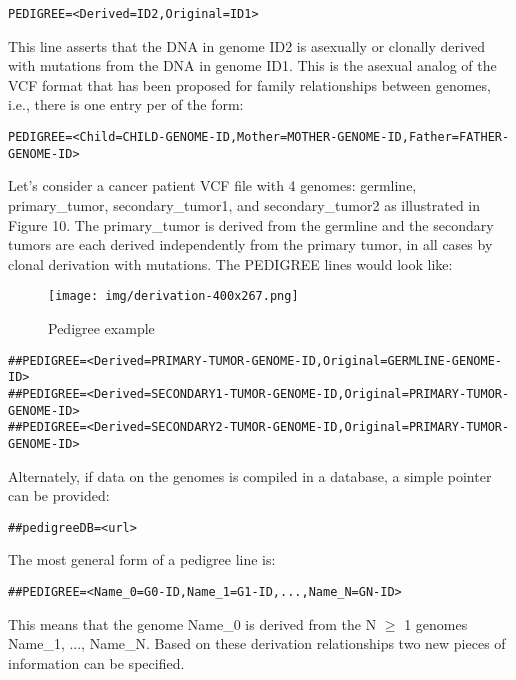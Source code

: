\documentclass[8pt]{article}
\begin{document}
\begin{verbatim}
PEDIGREE=<Derived=ID2,Original=ID1>
\end{verbatim}

This line asserts that the DNA in genome ID2 is asexually or clonally derived with mutations from the DNA in genome ID1. This is the asexual analog of the VCF format that has been proposed for family relationships between genomes, i.e., there is one entry per of the form:

\begin{verbatim}
PEDIGREE=<Child=CHILD-GENOME-ID,Mother=MOTHER-GENOME-ID,Father=FATHER-GENOME-ID>
\end{verbatim}

Let's consider a cancer patient VCF file with 4 genomes: germline, primary\_tumor, secondary\_tumor1, and secondary\_tumor2 as illustrated in Figure 10. The primary\_tumor is derived from the germline and the secondary tumors are each derived independently from the primary tumor, in all cases by clonal derivation with mutations. The PEDIGREE lines would look like:

\begin{figure}[ht]
\centering
\texttt{[image: img/derivation-400x267.png]}
\caption{Pedigree example}
\end{figure}

\begin{verbatim}
##PEDIGREE=<Derived=PRIMARY-TUMOR-GENOME-ID,Original=GERMLINE-GENOME-ID>
##PEDIGREE=<Derived=SECONDARY1-TUMOR-GENOME-ID,Original=PRIMARY-TUMOR-GENOME-ID>
##PEDIGREE=<Derived=SECONDARY2-TUMOR-GENOME-ID,Original=PRIMARY-TUMOR-GENOME-ID>
\end{verbatim}

Alternately, if data on the genomes is compiled in a database, a simple pointer can be provided:

\begin{verbatim}
##pedigreeDB=<url>
\end{verbatim}

The most general form of a pedigree line is:

\begin{verbatim}
##PEDIGREE=<Name_0=G0-ID,Name_1=G1-ID,...,Name_N=GN-ID>
\end{verbatim}

This means that the genome Name\_0 is derived from the N $\ge$ 1 genomes Name\_1, ..., Name\_N. Based on these derivation relationships two new pieces of information can be specified.
\end{document}
